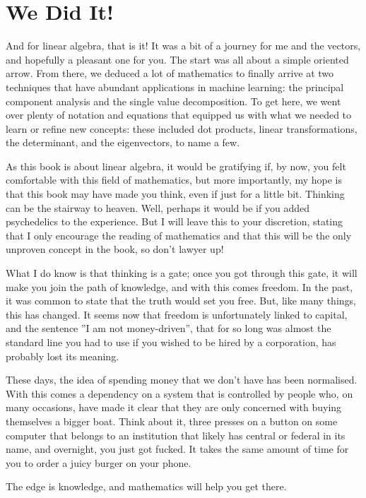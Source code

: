 \documentclass[600paper, 11pt,twoside,openany]{kdp}
\begin{document}
\section{We Did It!}
\indent And for linear algebra, that is it! It was a bit of a journey for me and the vectors, and hopefully a pleasant one for you. The start was all about a simple oriented arrow. From there, we deduced a lot of mathematics to finally arrive at two techniques that have abundant applications in machine learning: the principal component analysis and the single value decomposition. To get here, we went over plenty of notation and equations that equipped us with what we needed to learn or refine new concepts: these included dot products, linear transformations, the determinant, and the eigenvectors, to name a few.
\par 
\vspace{-3pt}
\indent As this book is about linear algebra, it would be gratifying if, by now, you felt comfortable with this field of mathematics, but more importantly, my hope is that this book may have made you think, even if just for a little bit. Thinking can be the stairway to heaven. Well, perhaps it would be if you added psychedelics to the experience. But I will leave this to your discretion, stating that I only encourage the reading of mathematics and that this will be the only unproven concept in the book, so don’t lawyer up! 
\par 
\vspace{-3pt}
\indent What I do know is that thinking is a gate; once you got through this gate, it will make you join the path of knowledge, and with this comes freedom. In the past, it was common to state that the truth would set you free. But, like many things, this has changed. It seems now that freedom is unfortunately linked to capital, and the sentence ”I am not money-driven”, that for so long was almost the standard line you had to use if you wished to be hired by a corporation, has probably lost its meaning. 
\par 
\vspace{-3pt}
\indent These days, the idea of spending money that we don’t have has been normalised. With this comes a dependency on a system that is controlled by people who, on many occasions, have made it clear that they are only concerned with buying themselves a bigger boat. Think about it, three presses on a button on some computer that belongs to an institution that likely has central or federal in its name, and overnight, you just got fucked. It takes the same amount of time for you to order a juicy burger on your phone. 
\par 
\vspace{-3pt}
\indent The edge is knowledge, and mathematics will help you get there.
\end{document}
